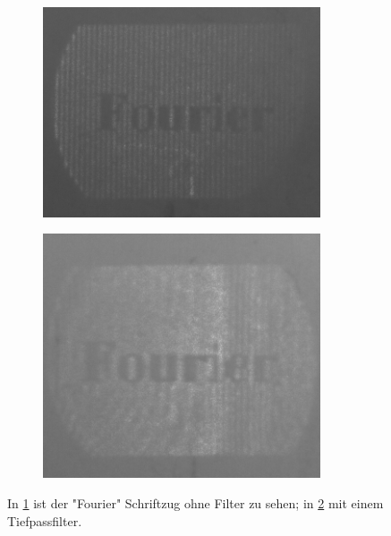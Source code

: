 \begin{figure}[h]
\begin{subfigure}[c]{0.5\textwidth}

\includegraphics[width=0.9\textwidth]{Fourier.png}
	      \caption{}
          \label{fig:NiceImage1}
          
\end{subfigure}
\begin{subfigure}[c]{0.5\textwidth}
	\includegraphics[width=0.9\textwidth]{Fourier_Filter.png}
	      \caption{}
          \label{fig:NiceImage2}
\end{subfigure}
\caption{In \cref{fig:NiceImage1} ist der "Fourier" Schriftzug ohne Filter zu sehen; in \cref{fig:NiceImage2} mit einem Tiefpassfilter.}
\label{Fourier}
\end{figure}   

